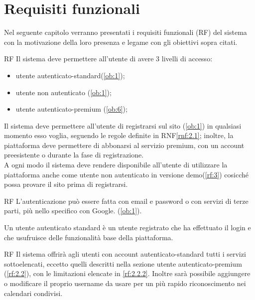 \section{Requisiti funzionali}
\label{sec:RequisitiFunzionali}

Nel seguente capitolo verranno presentati i requisiti funzionali (RF) del sistema con la motivazione della loro presenza e legame con gli obiettivi sopra citati.

\begin{listaPersonale}{RF}
	 Il sistema deve permettere all'utente di avere 3 livelli di accesso:
	\begin{itemize}
		\item utente autenticato-standard(\ref{ob:1});
		\item utente non autenticato (\ref{ob:1});
		\item utente autenticato-premium (\ref{ob:6});
	\end{itemize}
	Il sistema deve permettere all'utente di registrarsi sul sito (\ref{ob:1}) in qualsiasi momento esso voglia, seguendo le regole definite in RNF\ref{rnf:2.1}; inoltre, la piattaforma deve permettere di abbonarsi al servizio premium, con un account preesistente o durante la fase di registrazione.\\
	A ogni modo il sistema deve rendere disponibile all'utente di utilizzare la piattaforma anche come utente non autenticato in versione demo(\ref{rf:3}) cosicché possa provare il sito prima di registrarsi.

	\begin{listaPersonale2}{RF}
		 L'autenticazione può essere fatta con email e password o con servizi di terze parti, più nello specifico con Google. (\ref{ob:1}).
	\end{listaPersonale2}

	 Un utente autenticato standard è un utente registrato che ha effettuato il login e che usufruisce delle funzionalità base della piattaforma.

	\begin{listaPersonale2}{RF}
		 Il sistema offrirà agli utenti con account autenticato-standard tutti i servizi sottoelencati, eccetto quelli descritti nella sezione utente autenticato-premium (\ref{rf:2.2}), con le limitazioni elencate in \ref{rf:2.2.2}. Inoltre sarà possibile aggiungere o modificare il proprio username da usare per un più rapido riconoscimento nei calendari condivisi.


\end{listaPersonale2}
\end{listaPersonale}
